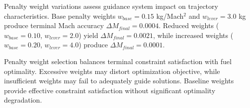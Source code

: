 
Penalty weight variations assess guidance system impact on trajectory characteristics. Base penalty weights $w_{base} = 0.15$ kg/Mach$^2$ and $w_{lever} = 3.0$ kg produce terminal Mach accuracy $\Delta M_{final} = 0.0004$. Reduced weights ($w_{base} = 0.10$, $w_{lever} = 2.0$) yield $\Delta M_{final} = 0.0021$, while increased weights ($w_{base} = 0.20$, $w_{lever} = 4.0$) produce $\Delta M_{final} = 0.0001$.

Penalty weight selection balances terminal constraint satisfaction with fuel optimality. Excessive weights may distort optimization objective, while insufficient weights may fail to adequately guide solutions. Baseline weights provide effective constraint satisfaction without significant optimality degradation.
